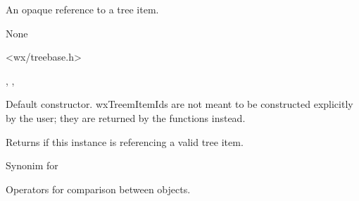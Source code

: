 An opaque reference to a tree item.



None


<wx/treebase.h>


, ,\\



\label{wxtreeitemidconstr}


Default constructor. wxTreemItemIds are not meant to be constructed explicitly by
the user; they are returned by the  functions instead.


\label{wxtreeitemidisok}


Returns \true if this instance is referencing a valid tree item.


\label{wxtreeitemidoperators}


Synonim for 




Operators for comparison between  objects.

